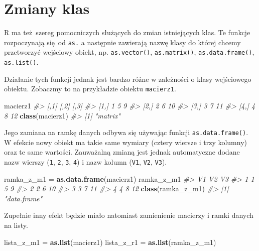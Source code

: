 \documentclass[paper=6in:9in,pagesize=pdftex,headinclude=on,footinclude=on,10pt]{scrbook}
\newenvironment{Shaded}{\begin{snugshade}}{\end{snugshade}}
\newcommand{\CommentTok}[1]{\textcolor[rgb]{0.56,0.35,0.01}{\textit{#1}}}
\newcommand{\KeywordTok}[1]{\textcolor[rgb]{0.13,0.29,0.53}{\textbf{#1}}}
\newcommand{\NormalTok}[1]{#1}
\newcommand{\StringTok}[1]{\textcolor[rgb]{0.31,0.60,0.02}{#1}}
\begin{document}
\hypertarget{zmiany-klas}{%
\section{Zmiany klas}\label{zmiany-klas}}

R ma też~szereg pomocniczych służących do zmian istniejących klas.
Te funkcje rozpoczynają się~od \texttt{as.} a następnie zawierają nazwę klasy do której chcemy przetworzyć wejściowy obiekt, np. \texttt{as.vector()}, \texttt{as.matrix()}, \texttt{as.data.frame()}, \texttt{as.list()}.

Działanie tych funkcji jednak jest bardzo różne w zależności o klasy wejściowego obiektu.
Zobaczmy to na przykładzie obiektu \texttt{macierz1}.

\begin{Shaded}
\begin{Highlighting}[]
\NormalTok{macierz1}
\CommentTok{#>      [,1] [,2] [,3]}
\CommentTok{#> [1,]    1    5    9}
\CommentTok{#> [2,]    2    6   10}
\CommentTok{#> [3,]    3    7   11}
\CommentTok{#> [4,]    4    8   12}
\KeywordTok{class}\NormalTok{(macierz1)}
\CommentTok{#> [1] "matrix"}
\end{Highlighting}
\end{Shaded}

Jego zamiana na ramkę danych odbywa się używając funkcji \texttt{as.data.frame()}.
W efekcie nowy obiekt ma takie same wymiary (cztery wiersze i trzy kolumny) oraz te same wartości.
Zauważalną zmianą jest jednak automatyczne dodane nazw wierszy (\texttt{1}, \texttt{2}, \texttt{3}, \texttt{4}) i nazw kolumn (\texttt{V1}, \texttt{V2}, \texttt{V3}).

\begin{Shaded}
\begin{Highlighting}[]
\NormalTok{ramka_z_m1 =}\StringTok{ }\KeywordTok{as.data.frame}\NormalTok{(macierz1)}
\NormalTok{ramka_z_m1}
\CommentTok{#>   V1 V2 V3}
\CommentTok{#> 1  1  5  9}
\CommentTok{#> 2  2  6 10}
\CommentTok{#> 3  3  7 11}
\CommentTok{#> 4  4  8 12}
\KeywordTok{class}\NormalTok{(ramka_z_m1)}
\CommentTok{#> [1] "data.frame"}
\end{Highlighting}
\end{Shaded}

Zupełnie inny efekt będzie miało natomiast zamienienie macierzy i ramki danych na listy.

\begin{Shaded}
\begin{Highlighting}[]
\NormalTok{lista_z_m1 =}\StringTok{ }\KeywordTok{as.list}\NormalTok{(macierz1)}
\NormalTok{lista_z_r1 =}\StringTok{ }\KeywordTok{as.list}\NormalTok{(ramka_z_m1)}
\end{Highlighting}
\end{Shaded}
\end{document}
